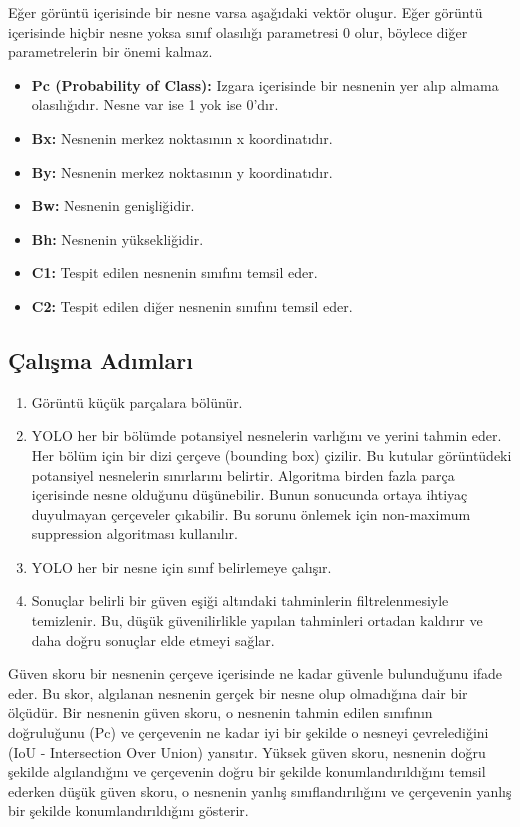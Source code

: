 Eğer görüntü içerisinde bir nesne varsa aşağıdaki vektör oluşur. Eğer görüntü içerisinde hiçbir nesne yoksa sınıf olasılığı parametresi 0 olur, böylece diğer parametrelerin bir önemi kalmaz.
\begin{itemize}
	\item \textbf{Pc (Probability of Class):} Izgara içerisinde bir nesnenin yer alıp almama olasılığıdır. Nesne var ise 1 yok ise 0'dır.
	\item \textbf{Bx:} Nesnenin merkez noktasının x koordinatıdır.
	\item \textbf{By:} Nesnenin merkez noktasının y koordinatıdır.
	\item \textbf{Bw:} Nesnenin genişliğidir.
	\item \textbf{Bh:} Nesnenin yüksekliğidir.
	\item \textbf{C1:} Tespit  edilen nesnenin sınıfını temsil eder.
	\item \textbf{C2:} Tespit edilen diğer nesnenin sınıfını temsil eder.
\end{itemize}

\subsection{Çalışma Adımları}
\begin{enumerate}
	\item Görüntü küçük parçalara bölünür.
	\item YOLO her bir bölümde potansiyel nesnelerin varlığını ve yerini tahmin eder. Her bölüm için bir dizi çerçeve (bounding box) çizilir. Bu kutular görüntüdeki potansiyel nesnelerin sınırlarını belirtir. Algoritma birden fazla parça içerisinde nesne olduğunu düşünebilir. Bunun sonucunda ortaya ihtiyaç duyulmayan çerçeveler çıkabilir. Bu sorunu önlemek için non-maximum suppression algoritması kullanılır.
	\item YOLO her bir nesne için sınıf belirlemeye çalışır.
	\item Sonuçlar belirli bir güven eşiği altındaki tahminlerin filtrelenmesiyle temizlenir. Bu, düşük güvenilirlikle yapılan tahminleri ortadan kaldırır ve daha doğru sonuçlar elde etmeyi sağlar.
\end{enumerate}

Güven skoru bir nesnenin çerçeve içerisinde ne kadar güvenle bulunduğunu ifade eder. Bu skor, algılanan nesnenin gerçek bir nesne olup olmadığına dair bir ölçüdür. Bir nesnenin güven skoru, o nesnenin tahmin edilen sınıfının doğruluğunu (Pc) ve çerçevenin ne kadar iyi bir şekilde o nesneyi çevrelediğini (IoU - Intersection Over Union) yansıtır. Yüksek güven skoru, nesnenin doğru şekilde algılandığını ve çerçevenin doğru bir şekilde konumlandırıldığını temsil ederken düşük güven skoru, o nesnenin yanlış sınıflandırılığını ve çerçevenin yanlış bir şekilde konumlandırıldığını gösterir.

